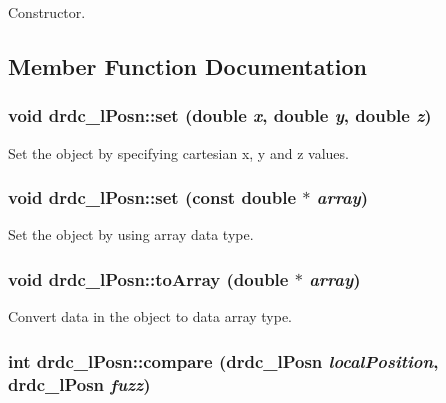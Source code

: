 Constructor. 



\subsection{Member Function Documentation}
\hypertarget{classdrdc__lPosn_189bd909895a0c424d953ae266660a98}{
\subsubsection[set]{\setlength{\rightskip}{0pt plus 5cm}void drdc\_\-lPosn::set (double {\em x}, \/  double {\em y}, \/  double {\em z})}}
\label{classdrdc__lPosn_189bd909895a0c424d953ae266660a98}


Set the object by specifying cartesian x, y and z values. 

\hypertarget{classdrdc__lPosn_d82b724217534dff477bebbfb35d9cc2}{
\subsubsection[set]{\setlength{\rightskip}{0pt plus 5cm}void drdc\_\-lPosn::set (const double $\ast$ {\em array})}}
\label{classdrdc__lPosn_d82b724217534dff477bebbfb35d9cc2}


Set the object by using array data type. 

\hypertarget{classdrdc__lPosn_6479858b0308f15d6d08db65ac111cff}{
\subsubsection[toArray]{\setlength{\rightskip}{0pt plus 5cm}void drdc\_\-lPosn::toArray (double $\ast$ {\em array})}}
\label{classdrdc__lPosn_6479858b0308f15d6d08db65ac111cff}


Convert data in the object to data array type. 

\hypertarget{classdrdc__lPosn_f0a8ba3a6236839ec981029ad9c3d9f9}{
\subsubsection[compare]{\setlength{\rightskip}{0pt plus 5cm}int drdc\_\-lPosn::compare ({\bf drdc\_\-lPosn} {\em localPosition}, \/  {\bf drdc\_\-lPosn} {\em fuzz})}}
\label{classdrdc__lPosn_f0a8ba3a6236839ec981029ad9c3d9f9}



